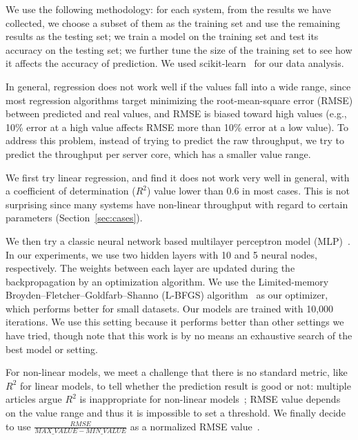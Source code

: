 We use the following methodology: for each system, from the results we have collected, we choose a subset of them as the training
set and use the remaining results as the testing set; we train a model on the training
set and test its accuracy on the testing set; we further tune the size of the training set to see how
it affects the accuracy of prediction. 
We used scikit-learn~\cite{scikit-learn} for our data analysis.

In general, regression does not work well if the values fall into a wide range, since most regression
algorithms target minimizing the root-mean-square error (RMSE) between predicted and real values, and
RMSE is biased toward high values (e.g., 10\% error at a high value affects RMSE more than
10\% error at a low value). To address this problem, instead of trying to predict the raw throughput,
we try to predict the throughput per server core, which has a smaller value range.

We first try linear regression, and find it does not work very well in general, with
a coefficient of determination ($R^2$) value lower than 0.6 in most cases. This is not surprising since many systems
have non-linear throughput with regard to certain parameters (Section~\ref{sec:cases}).

We then try a classic neural network based multilayer perceptron model (MLP)~\cite{MLP1998}. 
In our experiments, we use two hidden layers with 10 and 5 neural nodes, respectively. 
The weights between each layer are updated during the backpropagation by
an optimization algorithm. We use the Limited-memory Broyden–Fletcher–Goldfarb–Shanno
(L-BFGS) algorithm~\cite{L-BFGS1989} as our optimizer, which performs better for small datasets.
Our models are trained with 10,000 iterations. We use this setting because it 
performs better than other settings we have tried, though note that this work
is by no means an exhaustive search of the best model or setting.

For non-linear models, we meet a challenge that there is no standard metric, like $R^2$ for linear
models, to tell whether the prediction result is good or not: multiple articles argue $R^2$ is inappropriate
for non-linear models~\cite{R2NonLinear,KvaLsethR2}; RMSE value depends on the value range and thus it is impossible to
set a threshold. We finally decide to use $\frac{RMSE}{MAX\_VALUE-MIN\_VALUE}$ 
as a
normalized RMSE value~\cite{normalizeRMSE}. 





